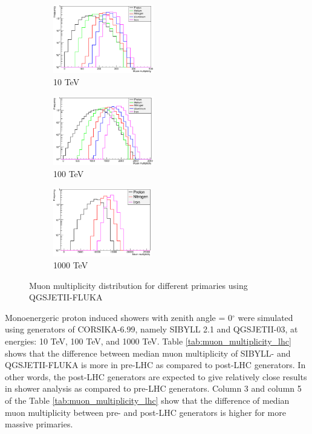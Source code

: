 \documentclass[12pt]{article}
\begin{document}
\begin{figure}
\begin{subfigure}{0.32\textwidth}
\includegraphics[width=0.9\linewidth, height=3cm]{qgsiimm10} 
\caption{10 TeV}
\label{fig:qgsiimm10}
\end{subfigure}
\begin{subfigure}{0.32\textwidth}
\includegraphics[width=0.9\linewidth, height=3cm]{qgsiimm100} 
\caption{100 TeV}
\label{fig:qgsiimm100}
\end{subfigure}
\begin{subfigure}{0.32\textwidth}
\includegraphics[width=0.9\linewidth, height = 3cm]{qgsiimm1000} 
\caption{1000 TeV}
\label{fig:qgsiimm1000}
\end{subfigure}
\caption{Muon multiplicity distribution for different primaries using QGSJETII-FLUKA}
\label{fig:qgsiimm}
\end{figure}


Monoenergeric proton induced showers with zenith angle = 0$^\circ$ were
simulated using generators of CORSIKA-6.99, namely SIBYLL 2.1 and QGSJETII-03,
at energies: 10 TeV, 100 TeV, and 1000 TeV. Table
\ref{tab:muon_multiplicity_lhc} shows that the difference between median muon
multiplicity of SIBYLL- and QGSJETII-FLUKA is more in pre-LHC as compared to
post-LHC generators. In other words, the post-LHC generators are expected to
give relatively close results in shower analysis as compared to pre-LHC
generators. Column 3 and column 5 of the Table \ref{tab:muon_multiplicity_lhc}
show that the difference of median muon multiplicity between pre- and post-LHC
generators is higher for more massive primaries. 
\end{document}
